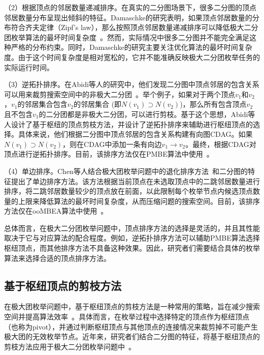 （2）根据顶点的邻居数量递减排序。在真实的二分图场景下，很多二分图的顶点邻居数量分布呈现出倾斜的特征。Damaschke的研究表明，如果顶点邻居数量的分布符合齐夫定律（Zipf's law），那么按照顶点邻居数量递减排序可以降低极大二分团枚举算法的最坏时间复杂度~\cite{Damaschke14}。然而，实际情况中很多二分图并不能完全满足这种严格的分布约束。同时，Damaschke的研究主要关注优化算法的最坏时间复杂度。由于这个时间复杂度是相对宽松的，它并不能准确反映极大二分团枚举任务的实际运行时间。

（3）逆拓扑排序。在Abidi等人的研究中，他们发现二分图中顶点邻居的包含关系可以用来裁剪搜索空间中的非极大二分团~\cite{PMBE20}。举个例子，如果对于两个顶点$v_1$和$v_2$，$v_1$的邻居集合包含$v_2$的邻居集合 (即$N(v_1)\supset N(v_2)$)，那么所有包含顶点$v_2$且不包含$v_1$的二分团都是非极大二分团，可以进行剪枝。基于这个思想，Abidi等人设计了基于枢纽的顶点剪枝方法，并设计了逆拓扑排序来辅助进行枢纽顶点的选择。具体来说，他们根据二分图中顶点邻居的包含关系构建有向图CDAG。如果$N(v_1)\supset N(v_2)$，则在CDAG中添加一条有向边$v_1\rightarrow v_2$。最终，根据CDAG对顶点进行逆拓扑排序。目前，该排序方法仅在PMBE算法中使用~\cite{PMBE20}。

（4）单边排序。Chen等人结合极大团枚举问题中的退化排序方法~\cite{MCEdegeneracy10}和二分图的特征提出了单边排序方法。该方法根据当前顶点在未选取顶点中的二跳邻居数量进行排序，将二跳邻居数量较少的顶点放在前面，以此限制每个枚举节点内候选顶点数量的上限来降低算法的最坏时间复杂度，从而压缩问题的搜索空间。目前，该排序方法仅在ooMBEA算法中使用~\cite{ooMBE22}。

总体而言，在极大二分团枚举问题中，顶点排序方法的选择是灵活的，并且其性能取决于它与对应算法的配合程度。例如，逆拓扑排序方法可以辅助PMBE算法选择枢纽顶点，而其他排序方法不具备这种效果。因此，研究者们需要结合具体的枚举算法来选择合适的顶点排序方法。

\subsection{基于枢纽顶点的剪枝方法}
\label{subsec:pivot}

在极大团枚举问题中，基于枢纽顶点的剪枝方法是一种常用的策略，旨在减少搜索空间并提高算法效率~\cite{MCEdegeneracy10}。具体而言，在枚举过程中选择特定的顶点作为枢纽顶点（也称为pivot），并通过判断枢纽顶点与其他顶点的连接情况来裁剪掉不可能产生极大团的无效枚举节点。近年来，研究者们结合二分图的特征，将基于枢纽顶点的剪枝方法应用于极大二分团枚举问题中~\cite{PMBE20,ooMBE22}。

